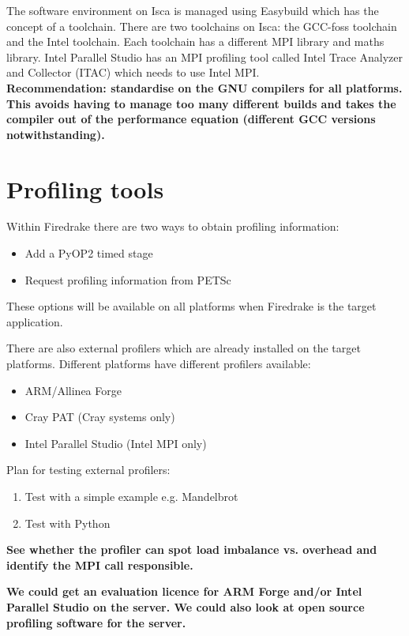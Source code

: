 \documentclass[a4paper,titlepage]{article}
\begin{document}
The software environment on Isca is managed using Easybuild which has the concept of a toolchain. There are two toolchains on Isca: the GCC-foss toolchain and the Intel toolchain. Each toolchain has a different MPI library and maths library. Intel Parallel Studio has an MPI profiling tool called Intel Trace Analyzer and Collector (ITAC) which needs to use Intel MPI. \\

\noindent
\textbf{Recommendation: standardise on the GNU compilers for all platforms. This avoids having to manage too many different builds and takes the compiler out of the performance equation (different GCC versions notwithstanding).}


\section{Profiling tools}

Within Firedrake there are two ways to obtain profiling information:
\begin{itemize}
\item Add a PyOP2 timed stage
\item Request profiling information from PETSc
\end{itemize}
These options will be available on all platforms when Firedrake is the target application.

There are also external profilers which are already installed on the target platforms. Different platforms have different profilers available:
\begin{itemize}
\item ARM/Allinea Forge
\item Cray PAT (Cray systems only)
\item Intel Parallel Studio (Intel MPI only)
\end{itemize}
%
Plan for testing external profilers:
\begin{enumerate}
\item Test with a simple example e.g. Mandelbrot
\item Test with Python
\end{enumerate}

\textbf{See whether the profiler can spot load imbalance vs. overhead and identify the MPI call responsible.}

\textbf{We could get an evaluation licence for ARM Forge and/or Intel Parallel Studio on the server. We could also look at open source profiling software for the server.} \\
\end{document}
